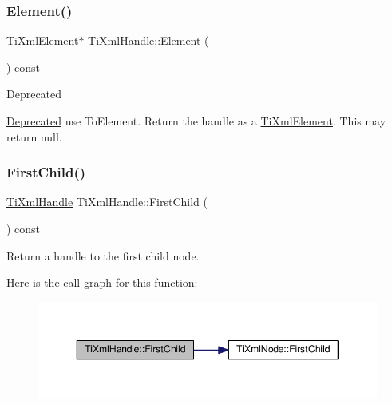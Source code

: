 \subsubsection{\texorpdfstring{Element()}{Element()}}
{\footnotesize\ttfamily \hyperlink{class_ti_xml_element}{Ti\+Xml\+Element}$\ast$ Ti\+Xml\+Handle\+::\+Element (\begin{DoxyParamCaption}{ }\end{DoxyParamCaption}) const\hspace{0.3cm}{\ttfamily [inline]}}

\begin{DoxyRefDesc}{Deprecated}
\item[\hyperlink{deprecated__deprecated000002}{Deprecated}]use To\+Element. Return the handle as a \hyperlink{class_ti_xml_element}{Ti\+Xml\+Element}. This may return null. \end{DoxyRefDesc}
\mbox{\label{class_ti_xml_handle_afb1b4c0eda970b320dfd262304cc1d04}} 
\subsubsection{\texorpdfstring{First\+Child()}{FirstChild()}\hspace{0.1cm}{\footnotesize\ttfamily [1/2]}}
{\footnotesize\ttfamily \hyperlink{class_ti_xml_handle}{Ti\+Xml\+Handle} Ti\+Xml\+Handle\+::\+First\+Child (\begin{DoxyParamCaption}{ }\end{DoxyParamCaption}) const}



Return a handle to the first child node. 

Here is the call graph for this function\+:\nopagebreak
\begin{figure}[H]
\begin{center}
\leavevmode
\includegraphics[width=350pt]{class_ti_xml_handle_afb1b4c0eda970b320dfd262304cc1d04_cgraph}
\end{center}
\end{figure}
\mbox{\label{class_ti_xml_handle_a586ebaca4a4d0909db65a765d95d5e59}} 
